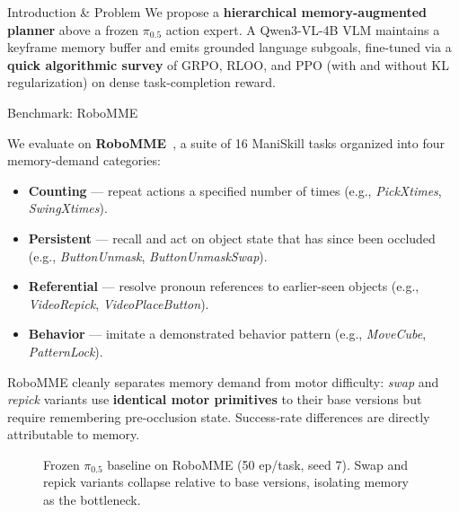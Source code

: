 \documentclass[final]{beamer}
\newlength{\colwidth}
\begin{document}
\begin{frame}[t]
\begin{columns}[t]
\begin{column}{\colwidth}
\begin{block}{Introduction \& Problem}
    \vspace{0.5em}
    We propose a \textbf{hierarchical memory-augmented planner} above a frozen $\pi_{0.5}$ action expert. A Qwen3-VL-4B VLM maintains a keyframe memory buffer and emits grounded language subgoals, fine-tuned via a \textbf{quick algorithmic survey} of GRPO, RLOO, and PPO (with and without KL regularization) on dense task-completion reward.

  \end{block}

  \begin{block}{Benchmark: RoboMME}

    We evaluate on \textbf{RoboMME}~\cite{robomme}, a suite of 16 ManiSkill tasks organized into four memory-demand categories:

    \begin{itemize}
      \item \textbf{Counting} --- repeat actions a specified number of times (e.g., \textit{PickXtimes}, \textit{SwingXtimes}).
      \item \textbf{Persistent} --- recall and act on object state that has since been occluded (e.g., \textit{ButtonUnmask}, \textit{ButtonUnmaskSwap}).
      \item \textbf{Referential} --- resolve pronoun references to earlier-seen objects (e.g., \textit{VideoRepick}, \textit{VideoPlaceButton}).
      \item \textbf{Behavior} --- imitate a demonstrated behavior pattern (e.g., \textit{MoveCube}, \textit{PatternLock}).
    \end{itemize}

    \vspace{0.5em}
    RoboMME cleanly separates memory demand from motor difficulty: \textit{swap} and \textit{repick} variants use \textbf{identical motor primitives} to their base versions but require remembering pre-occlusion state. Success-rate differences are directly attributable to memory.

    \vspace{1em}
    \begin{figure}[t]
      \centering
      \caption{Frozen $\pi_{0.5}$ baseline on RoboMME (50 ep/task, seed 7). Swap and repick variants collapse relative to base versions, isolating memory as the bottleneck.}
    \end{figure}


\end{block}
\end{column}
\end{columns}
\end{frame}
\end{document}
